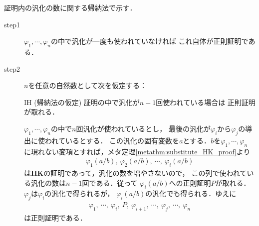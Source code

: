 	\begin{metaprf}
		証明内の汎化の数に関する帰納法で示す．
		\begin{description}
			\item[step1] $\varphi_{1},\cdots,\varphi_{n}$の中で汎化が一度も使われていなければ
				これ自体が正則証明である．
				
			\item[step2] $n$を任意の自然数として次を仮定する：
				\begin{itembox}[l]{IH (帰納法の仮定)}
					証明の中で汎化が$n-1$回使われている場合は
					正則証明が取れる．
				\end{itembox}
				$\varphi_{1},\cdots,\varphi_{n}$の中で$n$回汎化が使われているとし，
				最後の汎化が$\varphi_{i}$から$\varphi_{j}$の導出に使われているとする．
				この汎化の固有変数を$a$とする．$b$を$\varphi_{1},\cdots,\varphi_{n}$
				に現れない変項とすれば，メタ定理\ref{metathm:substitute_HK_proof}より
				\begin{align}
					\varphi_{1}(a/b),\ \varphi_{2}(a/b),\ \cdots,\ \varphi_{i}(a/b)
				\end{align}
				は{\bf HK}の証明であって，汎化の数を増やさないので，
				この列で使われている汎化の数は$n-1$回である．従って
				$\varphi_{i}(a/b)$への正則証明$P$が取れる．
				$\varphi_{j}$は$\varphi_{i}$の汎化で得られるが，
				$\varphi_{i}(a/b)$の汎化でも得られる．ゆえに
				\begin{align}
					\varphi_{1},\ \cdots,\ \varphi_{i},\ P,\ 
					\varphi_{i+1},\ \cdots,\ \varphi_{j},\ \cdots,\ \varphi_{n}
				\end{align}
				は正則証明である．
				\QED
		\end{description}
	\end{metaprf}
	
